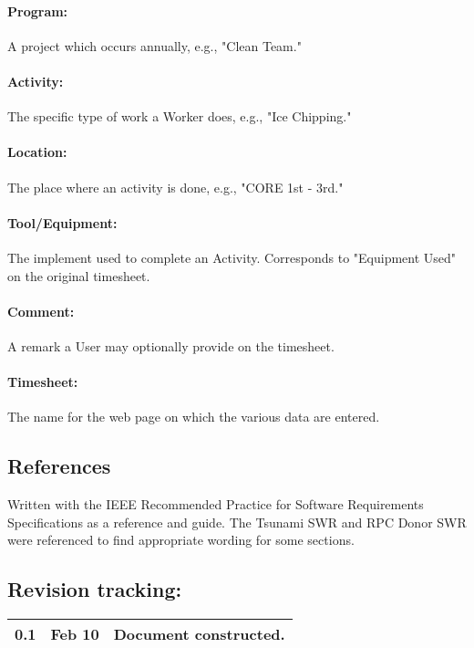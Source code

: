 \documentclass[12pt]{article}
\begin{document}
\paragraph{Program:} A project which occurs annually, e.g., "Clean Team."
\paragraph{Activity:} The specific type of work a Worker does, e.g., "Ice Chipping."
\paragraph{Location:} The place where an activity is done, e.g., "CORE 1st - 3rd."
\paragraph{Tool/Equipment:} The implement used to complete an Activity. Corresponds to "Equipment Used" on the original timesheet.
\paragraph{Comment:} A remark a User may optionally provide on the timesheet.
\paragraph{Timesheet:} The name for the web page on which the various data are entered.


\subsection{References}
Written with the IEEE Recommended Practice for Software Requirements Specifications as a reference and guide. The Tsunami SWR and RPC Donor SWR were referenced to find appropriate wording for some sections.

\subsection{Revision tracking:}
\begin{tabular}{|l|r|p{5in}|}
\hline
0.1 & Feb 10 & Document constructed.\\
\hline
\end{tabular}
\end{document}
